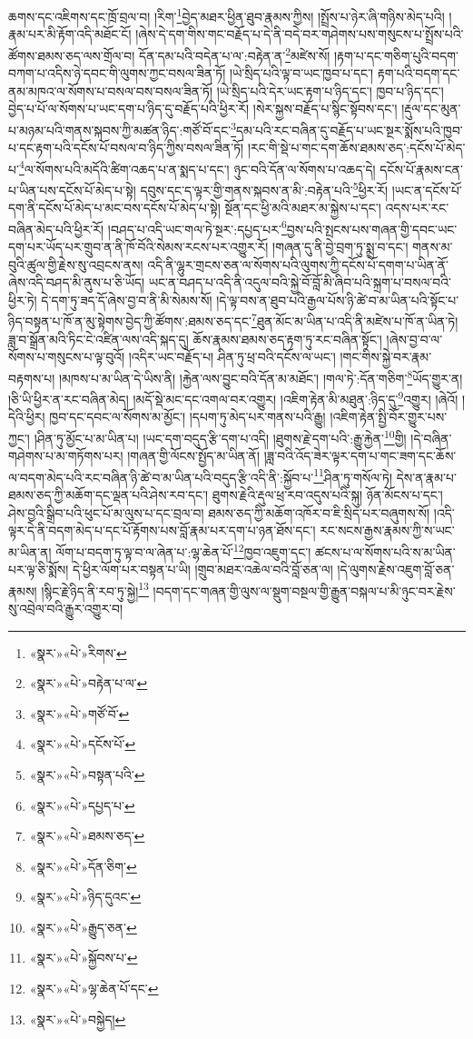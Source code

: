 ཆགས་དང་འཇིགས་དང་ཁྲོ་བྲལ་བ། །རིག་\footnote{«སྣར་»«པེ་»རིགས་}བྱེད་མཐར་ཕྱིན་ཐུབ་རྣམས་ཀྱིས། །སྤྲོས་པ་ཉེར་ཞི་གཉིས་མེད་པའི། །རྣམ་པར་མི་རྟོག་འདི་མཐོང་ངོ། །ཞེས་དེ་དག་གིས་གང་བརྗོད་པ་དེ་ནི་བདེ་བར་གཤེགས་པས་གསུངས་པ་སྤྲོས་པའི་ཚོགས་ཐམས་ཅད་ལས་གྲོལ་བ། དོན་དམ་པའི་བདེན་པ་ལ་:བརྟེན་ན་\footnote{«སྣར་»«པེ་»བརྟེན་པ་ལ་}མཛེས་སོ། །རྟག་པ་དང་གཅིག་པུའི་བདག་བཀག་པ་འདིས་ཉེ་དབང་གི་ལུགས་ཀྱང་བསལ་ཟིན་ཏོ། །ཡེ་སྲིད་པའི་ལྟ་བ་ཡང་ཁྱབ་པ་དང་། རྟག་པའི་བདག་དང་ནམ་མཁའ་ལ་སོགས་པ་བསལ་བས་བསལ་ཟིན་ཏོ། །ཡེ་སྲིད་པའི་དེར་ཡང་རྟག་པ་ཉིད་དང་། ཁྱབ་པ་ཉིད་དང་། བྱེད་པ་པོ་ལ་སོགས་པ་ཡང་དག་པ་ཉིད་དུ་བརྗོད་པའི་ཕྱིར་རོ། །སེར་སྐྱས་བརྗོད་པ་སྙིང་སྟོབས་དང་། །རྡུལ་དང་མུན་པ་མཉམ་པའི་གནས་སྐབས་ཀྱི་མཚན་ཉིད་:གཙོ་བོ་དང་\footnote{«སྣར་»«པེ་»གཙོ་བོ་}དམ་པའི་རང་བཞིན་དུ་བརྗོད་པ་ཡང་སྔར་སྨོས་པའི་ཁྱབ་པ་དང་རྟག་པའི་དངོས་པོ་བསལ་བ་ཉིད་ཀྱིས་བསལ་ཟིན་ཏོ། །རང་གི་སྡེ་པ་གང་དག་ཆོས་ཐམས་ཅད་:དངོས་པོ་མེད་པ་\footnote{«སྣར་»«པེ་»དངོས་པོ་}ལ་སོགས་པའི་མདོའི་ཚིག་འཆད་པ་ན་སྨད་པ་དང་། ཉུང་བའི་དོན་ལ་སོགས་པ་འཆད་དེ། དངོས་པོ་རྣམས་ངན་པ་ཡིན་པས་དངོས་པོ་མེད་པ་སྟེ། དབུས་དང་ད་ལྟར་གྱི་གནས་སྐབས་ན་མི་:བརྟེན་པའི་\footnote{«སྣར་»«པེ་»བསྟན་པའི་}ཕྱིར་རོ། །ཡང་ན་དངོས་པོ་དག་ནི་དངོས་པོ་མེད་པ་མང་བས་དངོས་པོ་མེད་པ་སྟེ། སྔོན་དང་ཕྱི་མའི་མཐར་མ་སྐྱེས་པ་དང་། འདས་པར་རང་བཞིན་མེད་པའི་ཕྱིར་རོ། །བཤད་པ་འདི་ཡང་གལ་ཏེ་སྔར་:དཔྱད་པར་\footnote{«སྣར་»«པེ་»དཔྱད་པ་}བྱས་པའི་སྤངས་པས་གཞན་གྱི་དབང་ཡང་དག་པར་ཡོད་པར་གྲུབ་ན་ནི་ཁོ་བོའི་སེམས་རངས་པར་འགྱུར་རོ། །གཞན་དུ་ནི་བྱེ་བྲག་ཏུ་སྨྲ་བ་དང་། གནས་མ་བུའི་ཚུལ་གྱི་རྗེས་སུ་འབྲངས་ནས། འདི་ནི་ལྷུར་གྲངས་ཅན་ལ་སོགས་པའི་ལུགས་ཀྱི་དངོས་པོ་དགག་པ་ཡིན་ནོ་ཞེས་འདི་བཤད་མི་ནུས་པ་ཅི་ཡོད། ཡང་ན་བཤད་པ་འདི་ནི་འདུལ་བའི་སྐྱེ་བོ་བློ་མི་ཞིབ་པའི་སྐྲག་པ་བསལ་བའི་ཕྱིར་ཏེ། དེ་དག་ཏུ་ཟད་དོ་ཞེས་བྱ་བ་ནི་མི་སེམས་སོ། །དེ་ལྟ་བས་ན་ཐུབ་པའི་རྒྱལ་པོས་ཉི་ཚེ་བ་མ་ཡིན་པའི་སྟོང་པ་ཉིད་བསྟན་པ་ཁོ་ན་མུ་སྟེགས་བྱེད་ཀྱི་ཚོགས་:ཐམས་ཅད་དང་\footnote{«སྣར་»«པེ་»ཐམས་ཅད་}ཐུན་མོང་མ་ཡིན་པ་འདི་ནི་མཛེས་པ་ཁོ་ན་ཡིན་ཏེ། ཟླ་བ་སྒྲོན་མའི་ཏིང་ངེ་འཛིན་ལས་འདི་སྐད་དུ། ཆོས་རྣམས་ཐམས་ཅད་རྟག་ཏུ་རང་བཞིན་སྟོང་། །ཞེས་བྱ་བ་ལ་སོགས་པ་གསུངས་པ་ལྟ་བུའོ། །འདིར་ཡང་བརྗོད་པ། ཤིན་ཏུ་ཕྲ་བའི་དངོས་ལ་ཡང་། །གང་གིས་སྐྱེ་བར་རྣམ་བརྟགས་པ། །མཁས་པ་མ་ཡིན་དེ་ཡིས་ནི། །རྐྱེན་ལས་བྱུང་བའི་དོན་མ་མཐོང་། །གལ་ཏེ་:དོན་གཅིག་\footnote{«སྣར་»«པེ་»དོན་ཅིག་}ཡོད་གྱུར་ན། །ཅི་ཡི་ཕྱིར་ན་རང་བཞིན་མེད། །མདོ་སྡེ་མང་དང་འགལ་བར་འགྱུར། །འཇིག་རྟེན་མི་མཐུན་:ཉིད་དུ་\footnote{«སྣར་»«པེ་»ཉིད་དུའང་}འགྱུར། །ཞེའོ། །དེའི་ཕྱིར། ཁྱབ་དང་དབང་ལ་སོགས་མ་མྱོང་། །དཔག་ཏུ་མེད་པར་གནས་པའི་རྒྱུ། །འཇིག་རྟེན་སྤྱི་བོར་གྱུར་པས་ཀྱང་། །ཤིན་ཏུ་མྱོང་པ་མ་ཡིན་པ། །ཡང་དག་བདུད་རྩི་དག་པ་འདི། །ཐུགས་རྗེ་དག་པའི་:རྒྱུ་རྐྱེན་\footnote{«སྣར་»«པེ་»རྒྱུད་ཅན་}གྱི། །དེ་བཞིན་གཤེགས་པ་མ་གཏོགས་པར། །གཞན་གྱི་ལོངས་སྤྱོད་མ་ཡིན་ནོ། །ཟླ་བའི་འོད་ཟེར་ལྟར་དག་པ་གང་ཟག་དང་ཆོས་ལ་བདག་མེད་པའི་རང་བཞིན་ཉི་ཚེ་བ་མ་ཡིན་པའི་བདུད་རྩི་འདི་ནི་:སྐྱོབ་པ་\footnote{«སྣར་»«པེ་»སྐྱོབས་པ་}ཤིན་ཏུ་གསོལ་ཏེ། དེས་ན་རྣམ་པ་ཐམས་ཅད་ཀྱི་མཆོག་དང་ལྡན་པའི་ཤེས་རབ་དང་། ཐུགས་རྗེའི་རྡུལ་ཕྲ་རབ་འདུས་པའི་སྐུ། ཉོན་མོངས་པ་དང་། ཤེས་བྱའི་སྒྲིབ་པའི་ཕུང་པོ་མ་ལུས་པ་དང་བྲལ་བ། ཐམས་ཅད་ཀྱི་མཆོག་འཁོར་བ་ཇི་སྲིད་པར་བཞུགས་སོ། །འདི་ལྟར་དེ་ནི་བདག་མེད་པ་དང་པོ་རྟོགས་པས་བློ་རྣམ་པར་དག་པ་ཉན་ཐོས་དང་། རང་སངས་རྒྱས་རྣམས་ཀྱི་ས་ཡང་མ་ཡིན་ན། ལོག་པ་བདག་ཏུ་ལྟ་བ་ལ་ཞེན་པ་:ལྷ་ཆེན་པོ་\footnote{«སྣར་»«པེ་»ལྷ་ཆེན་པོ་དང་}ཁྱབ་འཇུག་དང་། ཚངས་པ་ལ་སོགས་པའི་ས་མ་ཡིན་པར་ལྟ་ཅི་སྨོས། དེ་ཕྱིར་ལོག་པར་བསྟན་པ་ཡི། །གྲུབ་མཐར་འཆེལ་བའི་བློ་ཅན་ལ། །དེ་ལུགས་རྗེས་འཇུག་བློ་ཅན་རྣམས། །སྙིང་རྗེ་ཉིད་ནི་རབ་ཏུ་སྐྱེ།\footnote{«སྣར་»«པེ་»བསྐྱེད།} །བདག་དང་གཞན་གྱི་ལུས་ལ་སྡུག་བསྔལ་གྱི་རྒྱུན་བསྐལ་པ་མི་ཉུང་བར་རྗེས་སུ་འབྲེལ་བའི་རྒྱུར་འགྱུར་བ། 